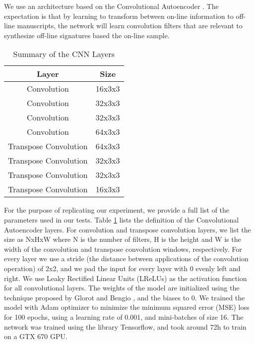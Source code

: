 We use an architecture based on the Convolutional Autoencoder \cite{masci2011stacked}. The expectation is that by learning to transform between on-line information to off-line manuscripts, the network will learn convolution filters that are relevant to synthesize off-line signatures based the on-line sample.

\begin{table}[htb]
\ABNTEXfontereduzida
\centering
\label{cnn-arch}
  \begin{tabular}{cc}
  \toprule
  Layer        & Size \\
   \midrule \midrule
  Convolution           & 16x3x3        \\ \midrule
  Convolution           & 32x3x3        \\ \midrule
  Convolution           & 32x3x3        \\ \midrule
  Convolution           & 64x3x3        \\ \midrule
  Transpose Convolution & 64x3x3        \\ \midrule
  Transpose Convolution & 32x3x3        \\ \midrule
  Transpose Convolution & 32x3x3        \\ \midrule
  Transpose Convolution & 16x3x3        \\ \bottomrule
   
  \end{tabular}

\caption{ Summary of the CNN Layers}
\end{table}


For the purpose of replicating our experiment,
we provide a full list of the parameters used in our tests. Table \ref{cnn-arch} lists the definition of the Convolutional Autoencoder layers. For convolution and
transpose convolution layers, we list the size as NxHxW where N is the
number of filters, H is the height and W is the width of the
convolution and transpose convolution windows, respectively. For every layer we use a stride (the distance between applications of the convolution operation) of 2x2, and we pad the input for every layer with 0  evenly left and right. We use Leaky Rectified Linear Units (LReLUs) as the activation function for all convolutional layers. The weights of the model are initialized using the technique proposed by Glorot and Bengio \cite{glorot2010understanding}, and the biases to 0. We trained the model with Adam optimizer to minimize the minimum squared error (MSE) loss for 100 epochs, using a learning rate of 0.001, and mini-batches of size 16. The network was trained
using the library Tensorflow, and took around 72h to train on a GTX 670 GPU.
